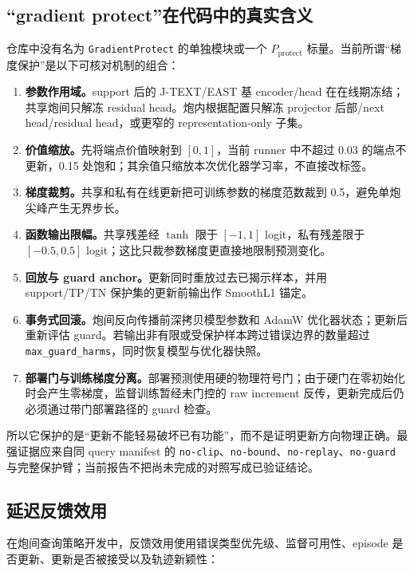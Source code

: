 \documentclass[11pt,a4paper]{article}
\newcommand{\code}[1]{\texttt{\small #1}}
\begin{document}
\subsection{“gradient protect”在代码中的真实含义}

仓库中没有名为 \code{GradientProtect} 的单独模块或一个 \(P_{\mathrm{protect}}\) 标量。当前所谓“梯度保护”是以下可核对机制的组合：

\begin{enumerate}
\item \textbf{参数作用域。}support 后的 J-TEXT/EAST 基 encoder/head 在在线期冻结；共享炮间只解冻 residual head。炮内根据配置只解冻 projector 后部/next head/residual head，或更窄的 representation-only 子集。
\item \textbf{价值缩放。}先将端点价值映射到 \([0,1]\)，当前 runner 中不超过 0.03 的端点不更新，0.15 处饱和；其余值只缩放本次优化器学习率，不直接改标签。
\item \textbf{梯度裁剪。}共享和私有在线更新把可训练参数的梯度范数裁到 0.5，避免单炮尖峰产生无界步长。
\item \textbf{函数输出限幅。}共享残差经 \(\tanh\) 限于 \([-1,1]\) logit，私有残差限于 \([-0.5,0.5]\) logit；这比只裁参数梯度更直接地限制预测变化。
\item \textbf{回放与 guard anchor。}更新同时重放过去已揭示样本，并用 support/TP/TN 保护集的更新前输出作 SmoothL1 锚定。
\item \textbf{事务式回滚。}炮间反向传播前深拷贝模型参数和 AdamW 优化器状态；更新后重新评估 guard。若输出非有限或受保护样本跨过错误边界的数量超过 \code{max\_guard\_harms}，同时恢复模型与优化器快照。
\item \textbf{部署门与训练梯度分离。}部署预测使用硬的物理符号门；由于硬门在零初始化时会产生零梯度，监督训练暂经未门控的 raw increment 反传，更新完成后仍必须通过带门部署路径的 guard 检查。
\end{enumerate}

所以它保护的是“更新不能轻易破坏已有功能”，而不是证明更新方向物理正确。最强证据应来自同 query manifest 的 \code{no-clip}、\code{no-bound}、\code{no-replay}、\code{no-guard} 与完整保护臂；当前报告不把尚未完成的对照写成已验证结论。

\subsection{延迟反馈效用}

在炮间查询策略开发中，反馈效用使用错误类型优先级、监督可用性、episode 是否更新、更新是否被接受以及轨迹新颖性：
\end{document}
